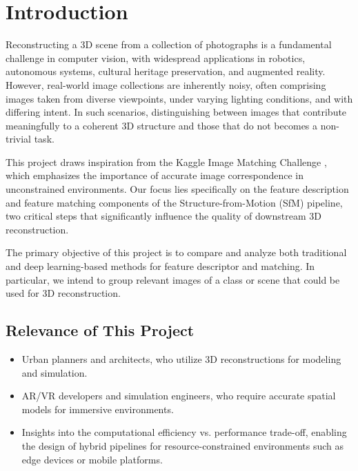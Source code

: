 \documentclass[report.tex]{subfiles}
\begin{document}
    \chapter{Introduction}

Reconstructing a 3D scene from a collection of photographs is a fundamental challenge in computer vision, with widespread applications in robotics, autonomous systems, cultural heritage preservation, and augmented reality. However, real-world image collections are inherently noisy, often comprising images taken from diverse viewpoints, under varying lighting conditions, and with differing intent. In such scenarios, distinguishing between images that contribute meaningfully to a coherent 3D structure and those that do not becomes a non-trivial task.

This project draws inspiration from the Kaggle Image Matching Challenge \cite{image-matching-challenge-2025}, which emphasizes the importance of accurate image correspondence in unconstrained environments. Our focus lies specifically on the feature description and feature matching components of the Structure-from-Motion (SfM) pipeline, two critical steps that significantly influence the quality of downstream 3D reconstruction.

The primary objective of this project is to compare and analyze both traditional and deep learning-based methods for feature descriptor and matching. In particular, we intend to group relevant images of a class or scene that could be used for 3D reconstruction. 








\section{Relevance of This Project}
\begin{itemize}
    \item Urban planners and architects, who utilize 3D reconstructions for modeling and simulation.
    \item AR/VR developers and simulation engineers, who require accurate spatial models for immersive environments.
    \item Insights into the computational efficiency vs. performance trade-off, enabling the design of hybrid pipelines for resource-constrained environments such as edge devices or mobile platforms.
 \end{itemize}
\end{document}
